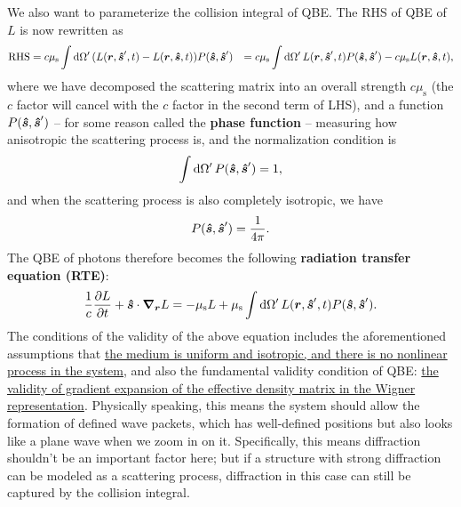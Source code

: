 \documentclass[hyperref, a4paper]{article}
\newcommand*{\concept}[1]{{\textbf{#1}}}
\def\\{}%
\begin{document}
We also want to parameterize the collision integral of QBE.
The RHS of QBE of $L$ is now rewritten as 
\begin{equation}
    \begin{aligned}
        \text{RHS} &= c \mu_{\text{s}} \int \dd{\Omega'} (L(\vb*{r}, \vu*{s}', t) - L(\vb*{r}, \vu*{s}, t)) P(\vu*{s}, \vu*{s}') \\
        &= c \mu_{\text{s}} \int \dd{\Omega'} L(\vb*{r}, \vu*{s}', t)  P(\vu*{s}, \vu*{s}')
        - c \mu_{\text{s}} L(\vb*{r}, \vu*{s}, t) ,
    \end{aligned}
\end{equation}
where we have decomposed the scattering matrix 
into an overall strength $c \mu_{\text{s}}$ 
(the $c$ factor will cancel with the $c$ factor in the second term of LHS), 
and a function $P(\vu*{s}, \vu*{s}')$ -- for some reason called the \concept{phase function} -- 
measuring how anisotropic the scattering process is, 
and the normalization condition is 
\begin{equation}
    \int \dd{\Omega'} P(\vu*{s}, \vu*{s}') = 1,
\end{equation}
and when the scattering process is also completely isotropic, we have 
\begin{equation}
    P(\vu*{s}, \vu*{s}') = \frac{1}{4 \pi}.
\end{equation}
The QBE of photons therefore becomes the following 
\concept{radiation transfer equation (RTE)}: 
\begin{equation}
    \frac{1}{c} \pdv{L}{t} + \vu*{s} \cdot \grad_{\vb*{r}} L = 
    - \mu_{\text{s}} L + \mu_{\text{s}} \int \dd{\Omega'} 
    L(\vb*{r}, \vu*{s}', t) P(\vu*{s}, \vu*{s}').
    \label{eq:rad-transfer-1}
\end{equation}
The conditions of the validity of the above equation 
includes the aforementioned assumptions that 
\ul{the medium is uniform and isotropic, 
and there is no nonlinear process in the system,} 
and also the fundamental validity condition of QBE: 
\ul{the validity of gradient expansion of the effective density matrix 
in the Wigner representation}.
Physically speaking, this means the system should allow 
the formation of defined wave packets, 
which has well-defined positions 
but also looks like a plane wave when we zoom in on it.
Specifically, this means diffraction shouldn't be an important factor here;
but if a structure with strong diffraction can be modeled as a scattering process, 
diffraction in this case can still be captured by the collision integral.
\end{document}
